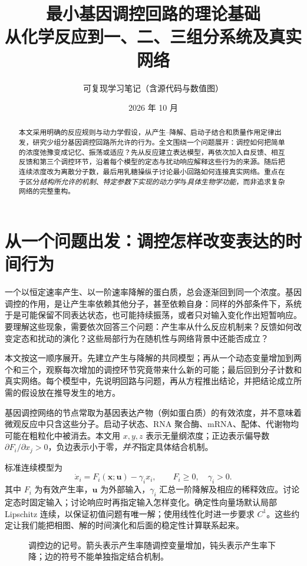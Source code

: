 \documentclass[11pt,a4paper,UTF8,fontset=fandol]{ctexart}
\title{\bfseries 最小基因调控回路的理论基础\\[4pt]\large 从化学反应到一、二、三组分系统及真实网络}
\author{可复现学习笔记（含源代码与数值图）}
\date{2026 年 10 月}
\begin{document}
\maketitle
\begin{abstract}
本文采用明确的反应规则与动力学假设，从产生--降解、启动子结合和质量作用定律出发，研究少组分基因调控回路所允许的行为。全文围绕一个问题展开：调控如何把简单的浓度弛豫变成记忆、振荡或适应？先从反应建立表达模型，再依次加入自反馈、相互反馈和第三个调控环节，沿着每个模型的定态与扰动响应解释这些行为的来源。随后把连续浓度改为离散分子数，最后用乳糖操纵子讨论最小回路如何连接真实网络。重点在于区分\emph{结构所允许的机制}、\emph{特定参数下实现的动力学}与\emph{具体生物学功能}，而非追求复杂网络的完整重构。
\end{abstract}
\newpage{\small\setlength{\parskip}{0pt}\tableofcontents}\newpage
\section{从一个问题出发：调控怎样改变表达的时间行为}
一个以恒定速率产生、以一阶速率降解的蛋白质，总会逐渐回到同一个浓度。基因调控的作用，是让产生率依赖其他分子，甚至依赖自身：同样的外部条件下，系统于是可能保留不同表达状态，也可能持续振荡，或者只对输入变化作出短暂响应。要理解这些现象，需要依次回答三个问题：产生率从什么反应机制来？反馈如何改变定态和扰动的演化？这些局部行为在随机性与网络背景中还能否成立？

本文按这一顺序展开。先建立产生与降解的共同模型；再从一个动态变量增加到两个和三个，观察每次增加的调控环节究竟带来什么新的可能；最后回到分子计数和真实网络。每个模型中，先说明回路与问题，再从方程推出结论，并把结论成立所需的假设放在推导发生的地方。

基因调控网络的节点常取为基因表达产物（例如蛋白质）的有效浓度，并不意味着微观反应中只含这些分子。启动子状态、RNA 聚合酶、mRNA、配体、代谢物均可能在粗粒化中被消去。本文用 $x,y,z$ 表示无量纲浓度；正边表示偏导数 $\partial F_i/\partial x_j>0$，负边表示小于零，\emph{并不}指定具体结合机制。

标准连续模型为
\begin{equation}\dot x_i=F_i(\bm{x};\bm{u})-\gamma_i x_i,\qquad F_i\geq0,\quad\gamma_i>0.\end{equation}
其中 $F_i$ 为有效产生率，$\bm u$ 为外部输入，$\gamma_i$ 汇总一阶降解及相应的稀释效应。讨论定态时固定输入；讨论响应时再指定输入怎样变化。确定性向量场默认局部 Lipschitz 连续，以保证初值问题有唯一解；使用线性化时进一步要求 $C^1$。这些约定让我们能把相图、解的时间演化和后面的稳定性计算联系起来。

\begin{figure}[H]\centering
{}
\caption{调控边的记号。箭头表示产生率随调控变量增加，钝头表示产生率下降；边的符号不能单独指定结合机制。}\label{fig:signs}
\end{figure}
\end{document}
